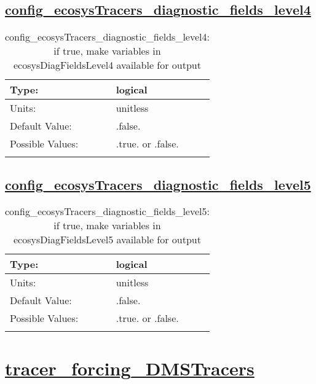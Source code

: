 \subsection[config\_ecosysTracers\_diagnostic\_fields\_level4]{\hyperref[sec:nm_tab_tracer_forcing_ecosysTracers]{config\_ecosysTracers\_diagnostic\_fields\_level4}}
\label{subsec:nm_sec_config_ecosysTracers_diagnostic_fields_level4}
\begin{center}
\begin{longtable}{| p{2.0in} || p{4.0in} |}
    \hline
    Type: & logical \\
    \hline
    Units: & \si{unitless} \\
    \hline
    Default Value: & .false. \\
    \hline
    Possible Values: & .true. or .false. \\
    \hline
    \caption{config\_ecosysTracers\_diagnostic\_fields\_level4: if true, make variables in ecosysDiagFieldsLevel4 available for output}
\end{longtable}
\end{center}
\subsection[config\_ecosysTracers\_diagnostic\_fields\_level5]{\hyperref[sec:nm_tab_tracer_forcing_ecosysTracers]{config\_ecosysTracers\_diagnostic\_fields\_level5}}
\label{subsec:nm_sec_config_ecosysTracers_diagnostic_fields_level5}
\begin{center}
\begin{longtable}{| p{2.0in} || p{4.0in} |}
    \hline
    Type: & logical \\
    \hline
    Units: & \si{unitless} \\
    \hline
    Default Value: & .false. \\
    \hline
    Possible Values: & .true. or .false. \\
    \hline
    \caption{config\_ecosysTracers\_diagnostic\_fields\_level5: if true, make variables in ecosysDiagFieldsLevel5 available for output}
\end{longtable}
\end{center}
\section[tracer\_forcing\_DMSTracers]{\hyperref[sec:nm_tab_tracer_forcing_DMSTracers]{tracer\_forcing\_DMSTracers}}
\label{sec:nm_sec_tracer_forcing_DMSTracers}

